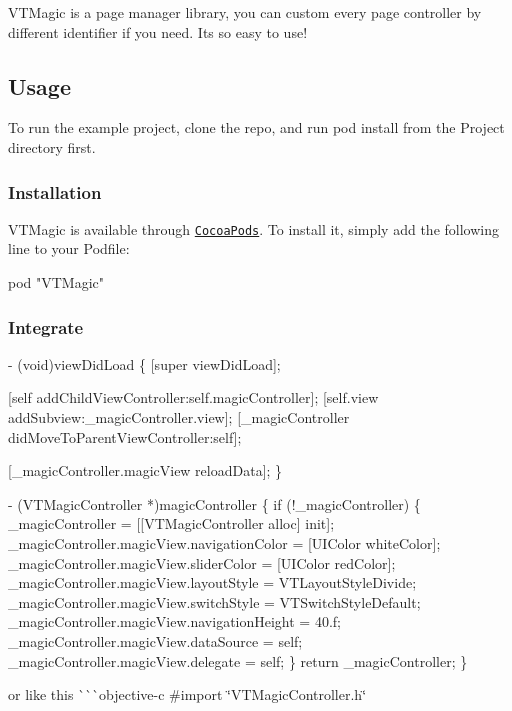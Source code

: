 V\+T\+Magic is a page manager library, you can custom every page controller by different identifier if you need. It\textquotesingle{}s so easy to use!

\subsection*{Usage}

To run the example project, clone the repo, and run {\ttfamily pod install} from the Project directory first.

\subsubsection*{Installation}

V\+T\+Magic is available through \href{http://cocoapods.org}{\tt Cocoa\+Pods}. To install it, simply add the following line to your Podfile\+:


\begin{DoxyCode}
pod "VTMagic"
\end{DoxyCode}


\subsubsection*{Integrate}


\begin{DoxyCode}
- (void)viewDidLoad
\{
    [super viewDidLoad];

    [self addChildViewController:self.magicController];
    [self.view addSubview:\_magicController.view];
    [\_magicController didMoveToParentViewController:self];

    [\_magicController.magicView reloadData];
\}

- (VTMagicController *)magicController
\{
    if (!\_magicController) \{
        \_magicController = [[VTMagicController alloc] init];
        \_magicController.magicView.navigationColor = [UIColor whiteColor];
        \_magicController.magicView.sliderColor = [UIColor redColor];
        \_magicController.magicView.layoutStyle = VTLayoutStyleDivide;
        \_magicController.magicView.switchStyle = VTSwitchStyleDefault;
        \_magicController.magicView.navigationHeight = 40.f;
        \_magicController.magicView.dataSource = self;
        \_magicController.magicView.delegate = self;
    \}
    return \_magicController;
\}
\end{DoxyCode}
 or like this \`{}\`{}\`{}objective-\/c \#import \char`\"{}\+V\+T\+Magic\+Controller.\+h\char`\"{} 